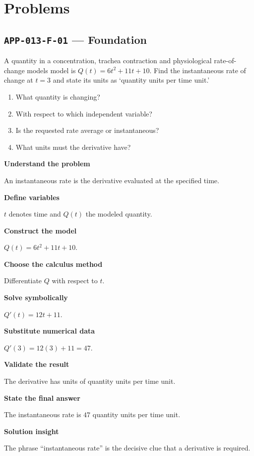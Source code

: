 \documentclass[11pt]{book}
\newcommand{\pid}[1]{\texttt{#1}}
\begin{document}
\section*{Problems}
\subsection*{\pid{APP-013-F-01} — Foundation}
\begin{problembox}
A quantity in a concentration, trachea contraction and physiological rate-of-change models model is $Q(t)=6t^2+11t+10$. Find the instantaneous rate of change at $t=3$ and state its units as ‘quantity units per time unit.’
\end{problembox}
\begin{promptbox}\begin{enumerate}
\item What quantity is changing?
\item With respect to which independent variable?
\item Is the requested rate average or instantaneous?
\item What units must the derivative have?
\end{enumerate}\end{promptbox}
\begin{solutionbox}
\textbf{Understand the problem}\par An instantaneous rate is the derivative evaluated at the specified time.\par\medskip
\textbf{Define variables}\par $t$ denotes time and $Q(t)$ the modeled quantity.\par\medskip
\textbf{Construct the model}\par $Q(t)=6t^2+11t+10$.\par\medskip
\textbf{Choose the calculus method}\par Differentiate $Q$ with respect to $t$.\par\medskip
\textbf{Solve symbolically}\par $Q'(t)=12t+11$.\par\medskip
\textbf{Substitute numerical data}\par $Q'(3)=12(3)+11=47$.\par\medskip
\textbf{Validate the result}\par The derivative has units of quantity units per time unit.\par\medskip
\textbf{State the final answer}\par The instantaneous rate is $47$ quantity units per time unit.\par\medskip
\textbf{Solution insight}\par The phrase “instantaneous rate” is the decisive clue that a derivative is required.\par\medskip
\end{solutionbox}
\end{document}
